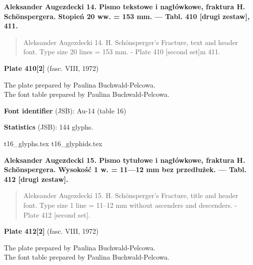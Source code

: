 \documentclass[12pt]{article}
\newcommand{\bg}{\begingl}
\newcommand{\pismoPL}[1]{{\relsize{2}\Junicode\textbf{#1}}}
\newcommand{\pismoEN}[1]{{\relsize{1}\Junicode\begin{quote}#1\end{quote}}}
\newcommand{\plate}[3]{\textbf{Plate #1} (fasc. #2, #3)}
\newcommand{\fontID}[2]{{\relsize{1}\Junicode\textbf{Font identifier} (JSB): #1 (table #2)}}
\newcommand{\fontstat}[1]{{\relsize{1}\Junicode\textbf{Statistics} (JSB): #1 glyphs.}}
\begin{document}


\pismoPL{Aleksander Augezdecki 14. Pismo tekstowe i nagłówkowe,
  fraktura H. Schönspergera. Stopień 20 ww. = 153 mm. — Tabl. 410
  [drugi zestaw], 411.}

\pismoEN{Aleksander Augezdecki 14. H. Schönsperger's Fracture, text
  and header font. Type size 20 lines = 153 mm. - Plate 410 [second
  set]m 411.}


\plate{410[2]}{VIII}{1972}

The plate    prepared by Paulina Buchwald-Pelcowa.\\
The font table    prepared by Paulina Buchwald-Pelcowa.\\

\bigskip

\fontID{Au-14}{16}

    \fontstat{144}

  {t16_glyphs.tex}
  {t16_glyphids.tex}


\newpage



\pismoPL{Aleksander Augezdecki 15. Pismo tytułowe i nagłówkowe,
  fraktura H. Schönspergera. Wysokość 1 w. = 11—12 mm bez
  przedłużek. — Tabl. 412 [drugi zestaw].}

\pismoEN{Aleksander Augezdecki 15. H. Schönsperger's Fracture, title
  and header font. Type size 1 line = 11--12 mm without ascenders and
  descenders. - Plate 412 [second set].}

\plate{412[2]}{VIII}{1972}

The plate    prepared by Paulina Buchwald-Pelcowa.\\
The font table    prepared by Paulina Buchwald-Pelcowa.\\
\end{document}
